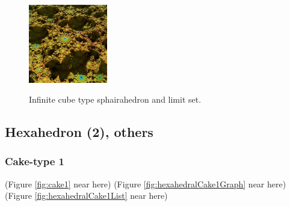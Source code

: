 \documentclass[suppldata, dvipdfmx]{interact}
\theoremstyle{plain}%
\theoremstyle{definition}
\theoremstyle{remark}
\theoremstyle{problemstyle}
\begin{document}
\begin{figure}[H]
\begin{minipage}{0.5\textwidth}
  \hspace*{\fill}
  \begin{minipage}[t]{0.24\textwidth}
   \centering
   \includegraphics[width=1.35in, height=1.35in,
   keepaspectratio]{./img/sphairahedron/cube/limitsetInf.jpg} 
   \label{fig:cubeInfiniteLimitset}
  \end{minipage}
  \hspace*{\fill}
  \caption{Infinite cube type sphairahedron and limit set.}
  \label{fig:cubeInf}
  \end{minipage}
\end{figure}


\subsection{Hexahedron (2), others}


\subsubsection{Cake-type 1}

\noindent(Figure \ref{fig:cake1} near here)
(Figure \ref{fig:hexahedralCake1Graph} near here)\\
(Figure \ref{fig:hexahedralCake1List}
 near here)
\end{document}
